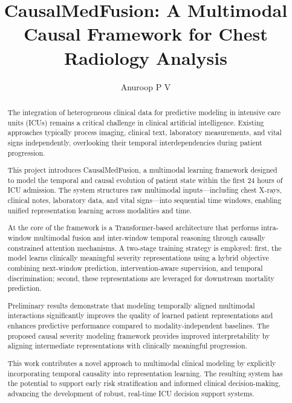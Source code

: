 \documentclass{fisatprojectfinal}
\title{CausalMedFusion: A Multimodal Causal Framework
for Chest Radiology Analysis}
\author{Anuroop P V}
\begin{document}
	\maketitle
	\makecert
\newpage
{}
\setcounter{page}{1}
\thispagestyle{empty}
\renewcommand\abstractname{ABSTRACT}
\begin{abstract}
	\vspace{2cm}
	\begin{onehalfspace}
		The integration of heterogeneous clinical data for predictive modeling in intensive care units (ICUs) remains a critical challenge in clinical artificial intelligence. Existing approaches typically process imaging, clinical text, laboratory measurements, and vital signs independently, overlooking their temporal interdependencies during patient progression.

This project introduces CausalMedFusion, a multimodal learning framework designed to model the temporal and causal evolution of patient state within the first 24 hours of ICU admission. The system structures raw multimodal inputs—including chest X-rays, clinical notes, laboratory data, and vital signs—into sequential time windows, enabling unified representation learning across modalities and time.

At the core of the framework is a Transformer-based architecture that performs intra-window multimodal fusion and inter-window temporal reasoning through causally constrained attention mechanisms. A two-stage training strategy is employed: first, the model learns clinically meaningful severity representations using a hybrid objective combining next-window prediction, intervention-aware supervision, and temporal discrimination; second, these representations are leveraged for downstream mortality prediction.

Preliminary results demonstrate that modeling temporally aligned multimodal interactions significantly improves the quality of learned patient representations and enhances predictive performance compared to modality-independent baselines. The proposed causal severity modeling framework provides improved interpretability by aligning intermediate representations with clinically meaningful progression.

This work contributes a novel approach to multimodal clinical modeling by explicitly incorporating temporal causality into representation learning. The resulting system has the potential to support early risk stratification and informed clinical decision-making, advancing the development of robust, real-time ICU decision support systems.
	\end{onehalfspace}
\end{abstract}
\end{document}

